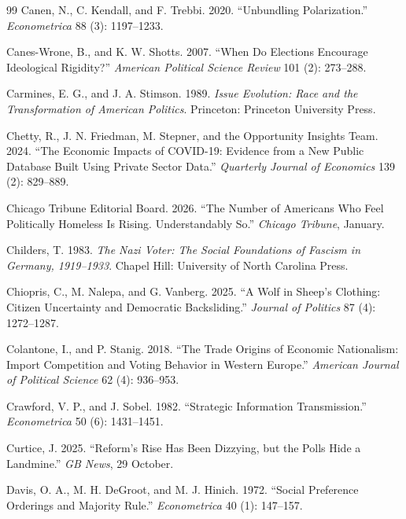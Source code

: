 \documentclass[12pt,letterpaper]{article}
\begin{document}
\begin{thebibliography}{99}
Canen, N., C. Kendall, and F. Trebbi. 2020. ``Unbundling Polarization.'' \textit{Econometrica} 88 (3): 1197--1233.

Canes-Wrone, B., and K. W. Shotts. 2007. ``When Do Elections Encourage Ideological Rigidity?'' \textit{American Political Science Review} 101 (2): 273--288.

Carmines, E. G., and J. A. Stimson. 1989. \textit{Issue Evolution: Race and the Transformation of American Politics}. Princeton: Princeton University Press.

Chetty, R., J. N. Friedman, M. Stepner, and the Opportunity Insights Team. 2024. ``The Economic Impacts of COVID-19: Evidence from a New Public Database Built Using Private Sector Data.'' \textit{Quarterly Journal of Economics} 139 (2): 829--889.

Chicago Tribune Editorial Board. 2026. ``The Number of Americans Who Feel Politically Homeless Is Rising. Understandably So.'' \textit{Chicago Tribune}, January.

Childers, T. 1983. \textit{The Nazi Voter: The Social Foundations of Fascism in Germany, 1919--1933}. Chapel Hill: University of North Carolina Press.

Chiopris, C., M. Nalepa, and G. Vanberg. 2025. ``A Wolf in Sheep's Clothing: Citizen Uncertainty and Democratic Backsliding.'' \textit{Journal of Politics} 87 (4): 1272--1287.

Colantone, I., and P. Stanig. 2018. ``The Trade Origins of Economic Nationalism: Import Competition and Voting Behavior in Western Europe.'' \textit{American Journal of Political Science} 62 (4): 936--953.

Crawford, V. P., and J. Sobel. 1982. ``Strategic Information Transmission.'' \textit{Econometrica} 50 (6): 1431--1451.

Curtice, J. 2025. ``Reform's Rise Has Been Dizzying, but the Polls Hide a Landmine.'' \textit{GB News}, 29 October.

Davis, O. A., M. H. DeGroot, and M. J. Hinich. 1972. ``Social Preference Orderings and Majority Rule.'' \textit{Econometrica} 40 (1): 147--157.


\end{thebibliography}
\end{document}
